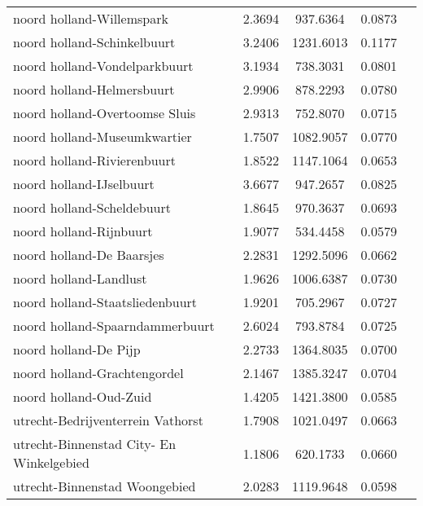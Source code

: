 \begin{longtable}{llccc}
	noord holland-Willemspark                 & 2.3694  & 937.6364  & 0.0873                 \\
	noord holland-Schinkelbuurt               & 3.2406  & 1231.6013 & 0.1177                 \\
	noord holland-Vondelparkbuurt             & 3.1934  & 738.3031  & 0.0801                 \\
	noord holland-Helmersbuurt                & 2.9906  & 878.2293  & 0.0780                 \\
	noord holland-Overtoomse Sluis            & 2.9313  & 752.8070  & 0.0715                 \\
	noord holland-Museumkwartier              & 1.7507  & 1082.9057 & 0.0770                 \\
	noord holland-Rivierenbuurt               & 1.8522  & 1147.1064 & 0.0653                 \\
	noord holland-IJselbuurt                  & 3.6677  & 947.2657  & 0.0825                 \\
	noord holland-Scheldebuurt                & 1.8645  & 970.3637  & 0.0693                 \\
	noord holland-Rijnbuurt                   & 1.9077  & 534.4458  & 0.0579                 \\
	noord holland-De Baarsjes                 & 2.2831  & 1292.5096 & 0.0662                 \\
	noord holland-Landlust                    & 1.9626  & 1006.6387 & 0.0730                 \\
	noord holland-Staatsliedenbuurt           & 1.9201  & 705.2967  & 0.0727                 \\
	noord holland-Spaarndammerbuurt           & 2.6024  & 793.8784  & 0.0725                 \\
	noord holland-De Pijp                     & 2.2733  & 1364.8035 & 0.0700                 \\
	noord holland-Grachtengordel              & 2.1467  & 1385.3247 & 0.0704                 \\
	noord holland-Oud-Zuid                    & 1.4205  & 1421.3800 & 0.0585                 \\
	utrecht-Bedrijventerrein Vathorst         & 1.7908  & 1021.0497 & 0.0663                 \\
	utrecht-Binnenstad City- En Winkelgebied  & 1.1806  & 620.1733  & 0.0660                 \\
	utrecht-Binnenstad Woongebied             & 2.0283  & 1119.9648 & 0.0598                 \\

\end{longtable}
